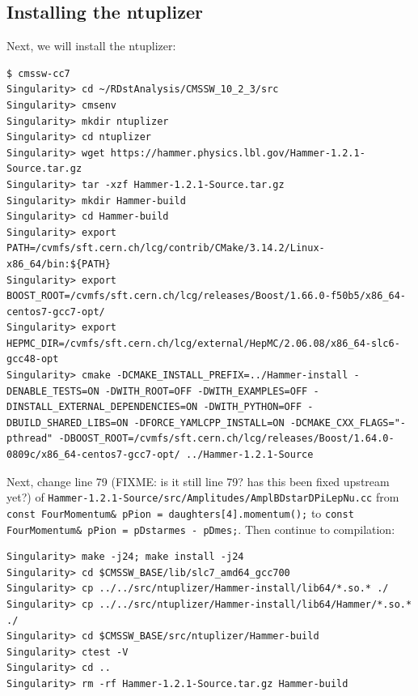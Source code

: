 \documentclass[12pt]{report}
\begin{document}
\subsection{Installing the ntuplizer}
Next, we will install the ntuplizer:
\begin{mdframed}[backgroundcolor=light-gray, roundcorner=10pt,leftmargin=1, rightmargin=1, innerleftmargin=15, innertopmargin=15,innerbottommargin=15, outerlinewidth=1, linecolor=light-gray,roundcorner=20pt]
\begin{lstlisting}
$ cmssw-cc7
Singularity> cd ~/RDstAnalysis/CMSSW_10_2_3/src
Singularity> cmsenv
Singularity> mkdir ntuplizer
Singularity> cd ntuplizer
Singularity> wget https://hammer.physics.lbl.gov/Hammer-1.2.1-Source.tar.gz
Singularity> tar -xzf Hammer-1.2.1-Source.tar.gz
Singularity> mkdir Hammer-build
Singularity> cd Hammer-build
Singularity> export PATH=/cvmfs/sft.cern.ch/lcg/contrib/CMake/3.14.2/Linux-x86_64/bin:${PATH}
Singularity> export BOOST_ROOT=/cvmfs/sft.cern.ch/lcg/releases/Boost/1.66.0-f50b5/x86_64-centos7-gcc7-opt/
Singularity> export HEPMC_DIR=/cvmfs/sft.cern.ch/lcg/external/HepMC/2.06.08/x86_64-slc6-gcc48-opt
Singularity> cmake -DCMAKE_INSTALL_PREFIX=../Hammer-install -DENABLE_TESTS=ON -DWITH_ROOT=OFF -DWITH_EXAMPLES=OFF -DINSTALL_EXTERNAL_DEPENDENCIES=ON -DWITH_PYTHON=OFF -DBUILD_SHARED_LIBS=ON -DFORCE_YAMLCPP_INSTALL=ON -DCMAKE_CXX_FLAGS="-pthread" -DBOOST_ROOT=/cvmfs/sft.cern.ch/lcg/releases/Boost/1.64.0-0809c/x86_64-centos7-gcc7-opt/ ../Hammer-1.2.1-Source
\end{lstlisting}
\end{mdframed}
Next, change line 79 (FIXME: is it still line 79? has this been fixed upstream yet?) of \texttt{Hammer-1.2.1-Source/src/Amplitudes/AmplBDstarDPiLepNu.cc} from \texttt{const FourMomentum\& pPion = daughters[4].momentum();} to \texttt{const FourMomentum\& pPion = pDstarmes - pDmes;}. Then continue to compilation:
\begin{mdframed}[backgroundcolor=light-gray, roundcorner=10pt,leftmargin=1, rightmargin=1, innerleftmargin=15, innertopmargin=15,innerbottommargin=15, outerlinewidth=1, linecolor=light-gray,roundcorner=20pt]
\begin{lstlisting}
Singularity> make -j24; make install -j24
Singularity> cd $CMSSW_BASE/lib/slc7_amd64_gcc700
Singularity> cp ../../src/ntuplizer/Hammer-install/lib64/*.so.* ./
Singularity> cp ../../src/ntuplizer/Hammer-install/lib64/Hammer/*.so.* ./
Singularity> cd $CMSSW_BASE/src/ntuplizer/Hammer-build
Singularity> ctest -V
Singularity> cd ..
Singularity> rm -rf Hammer-1.2.1-Source.tar.gz Hammer-build
\end{lstlisting}
\end{mdframed}
\end{document}
